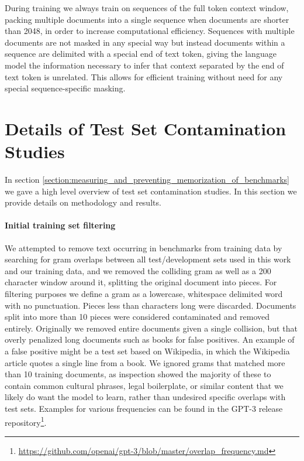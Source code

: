 \documentclass{article}
\begin{document}
During training we always train on sequences of the full  token context window, packing multiple documents into a single sequence when documents are shorter than 2048, in order to increase computational efficiency.  Sequences with multiple documents are not masked in any special way but instead documents within a sequence are delimited with a special end of text token, giving the language model the information necessary to infer that context separated by the end of text token is unrelated.  This allows for efficient training without need for any special sequence-specific masking. \section{Details of Test Set Contamination Studies}
\label{appendix:test_set_contamination}
In section \ref{section:measuring_and_preventing_memorization_of_benchmarks} we gave a high level overview of test set contamination studies. In this section we provide details on methodology and results.

\paragraph{Initial training set filtering} We attempted to remove text occurring in benchmarks from training data by searching for gram overlaps between all test/development sets used in this work and our training data, and we removed the colliding gram as well as a 200 character window around it, splitting the original document into pieces. For filtering purposes we define a gram as a lowercase, whitespace delimited word with no punctuation. Pieces less than  characters long were discarded. Documents split into more than 10 pieces were considered contaminated and removed entirely. Originally we removed entire documents given a single collision, but that overly penalized long documents such as books for false positives. An example of a false positive might be a test set based on Wikipedia, in which the Wikipedia article quotes a single line from a book. We ignored grams that matched more than 10 training documents, as inspection showed the majority of these to contain common cultural phrases, legal boilerplate, or similar content that we likely do want the model to learn, rather than undesired specific overlaps with test sets. Examples for various frequencies can be found in the GPT-3 release repository\footnote{\url{https://github.com/openai/gpt-3/blob/master/overlap_frequency.md}}.
\end{document}
